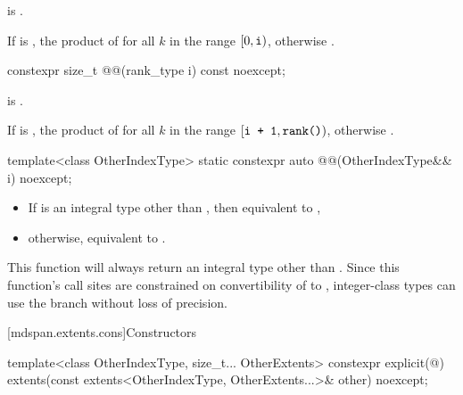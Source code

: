 \begin{itemdescr}
\pnum
\expects
{} is .

\pnum
\returns
If  is ,
the product of  for all $k$ in the range $[0, \texttt{\protect i})$,
otherwise .
\end{itemdescr}

\begin{itemdecl}
constexpr size_t @@(rank_type i) const noexcept;
\end{itemdecl}

\begin{itemdescr}
\pnum
\expects
{} is .

\pnum
\returns
If  is ,
the product of 
for all $k$ in the range $[\texttt{\protect i + 1}, \texttt{\protect rank()})$,
otherwise .
\end{itemdescr}

\begin{itemdecl}
template<class OtherIndexType>
  static constexpr auto @@(OtherIndexType&& i) noexcept;
\end{itemdecl}

\begin{itemdescr}
\pnum
\effects
\begin{itemize}
\item
If  is an integral type other than ,
then equivalent to ,
\item
otherwise, equivalent to .
\end{itemize}
\begin{note}
This function will always return an integral type other than .
Since this function's call sites are constrained on
convertibility of  to ,
integer-class types can use the  branch
without loss of precision.
\end{note}
\end{itemdescr}

[mdspan.extents.cons]{Constructors}

%
\begin{itemdecl}
template<class OtherIndexType, size_t... OtherExtents>
  constexpr explicit(@\seebelow@)
    extents(const extents<OtherIndexType, OtherExtents...>& other) noexcept;
\end{itemdecl}

